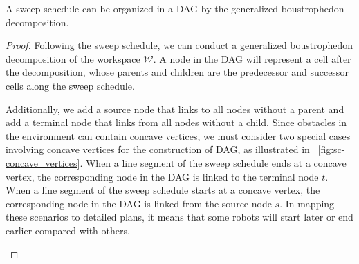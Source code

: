 \begin{theorem}
A sweep schedule can be organized in a DAG by the generalized boustrophedon decomposition.
\end{theorem}

\begin{proof}
Following the sweep schedule, we can conduct a generalized boustrophedon 
decomposition of the workspace $\mathcal W$. 
%
A node in the DAG will represent a cell after the decomposition, whose 
parents and children are the predecessor and successor cells along the 
sweep schedule. 

Additionally, we add a source node that links to all nodes without a parent 
and add a terminal node that links from all nodes without a child.
%
Since obstacles in the environment can contain concave vertices, we must 
consider two special cases involving concave vertices for the construction of DAG, 
as illustrated in ~\ref{fig:sc-concave_vertices}. 
%
When a line segment of the sweep schedule ends at a concave vertex, 
the corresponding node in the DAG is linked to the terminal node $t$.
When a line segment of the sweep schedule starts at a concave vertex,
the corresponding node in the DAG is linked from the source node $s$.
In mapping these scenarios to detailed plans, it means that 
some robots will start later or end earlier compared with 
others.

\begin{figure} [ht]
    \centering
\end{figure}
\end{proof}
